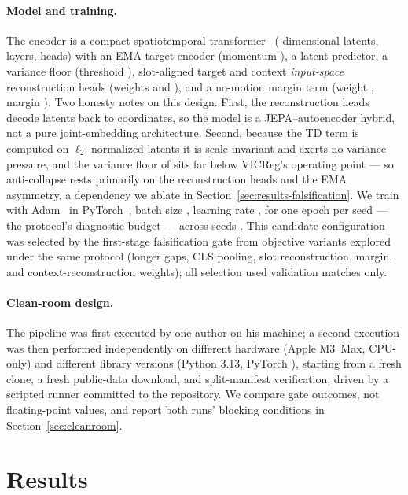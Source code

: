 \documentclass{article}
\begin{document}
\paragraph{Model and training.}
The encoder is a compact spatiotemporal transformer~\citep{vaswani2017attention}
(\ZDim-dimensional latents, \NumLayers{} layers, \NumHeads{} heads) with an
EMA target encoder (momentum \EmaMomentum), a latent predictor, a variance
floor (threshold \VarianceThreshold), slot-aligned target and
context \emph{input-space} reconstruction heads (weights \SlotReconWeight{}
and \ContextReconWeight), and a no-motion margin term (weight \MarginWeight,
margin \MarginValue). Two honesty notes on this design. First, the
reconstruction heads decode latents back to coordinates, so the model is a
JEPA--autoencoder hybrid, not a pure joint-embedding architecture. Second,
because the TD term is computed on $\ell_2$-normalized latents it is
scale-invariant and exerts no variance pressure, and the variance floor of
\VarianceThreshold{} sits far below VICReg's operating point --- so
anti-collapse rests primarily on the reconstruction heads and the EMA
asymmetry, a dependency we ablate in
Section~\ref{sec:results-falsification}. We train with Adam~\citep{kingma2015adam} in
PyTorch~\citep{paszke2019pytorch}, batch size \BatchSize, learning rate
\LearningRate, for one epoch per seed --- the protocol's diagnostic budget ---
across seeds \SeedList. This candidate configuration was selected by the
first-stage falsification gate from \VariantCount{} objective variants
explored under the same protocol (longer gaps, CLS pooling, slot
reconstruction, margin, and context-reconstruction weights); all selection
used validation matches only.

\paragraph{Clean-room design.}
\label{par:cleanroom-design}
The pipeline was first executed by one author on his machine; a second
execution was then performed independently on different hardware (Apple
M3~Max, CPU-only) and different library versions (Python 3.13, PyTorch
\TorchVersion), starting from a fresh clone, a fresh public-data download, and
split-manifest verification, driven by a scripted runner committed to the
repository. We compare gate outcomes, not floating-point values, and report
both runs' blocking conditions in Section~\ref{sec:cleanroom}.

\section{Results}
\label{sec:results}
\end{document}
